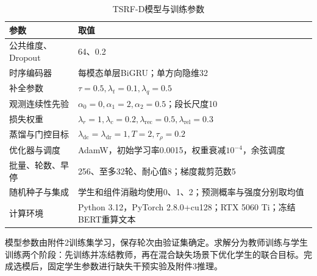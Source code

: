 \begin{table}[htbp]\centering\small
\caption{TSRF-D模型与训练参数}\label{q2:tab:params}
\begin{tabularx}{\linewidth}{p{4.4cm}Y}\toprule
参数 & 取值\\\midrule
公共维度、Dropout & 64、0.2\\
时序编码器 & 每模态单层BiGRU；单方向隐维32\\
补全参数 & $\tau=0.5,\lambda_t=0.1,\lambda_q=0.5$\\
观测连续性先验 & $\alpha_0=0,\alpha_1=2,\alpha_2=0.5$；段长尺度10\\
损失权重 & $\lambda_r=1,\lambda_c=0.2,\lambda_{\mathrm{rec}}=0.5,\lambda_{\mathrm{rel}}=0.3$\\
蒸馏与门控目标 & $\lambda_{\mathrm{dc}}=\lambda_{\mathrm{dr}}=1,T=2,\tau_{\rho}=0.2$\\
优化器与调度 & AdamW，初始学习率0.0015，权重衰减$10^{-4}$，余弦调度\\
批量、轮数、早停 & 256、至多32轮、耐心值8；梯度裁剪范数5\\
随机种子与集成 & 学生和组件消融均使用0、1、2；预测概率与强度分别取均值\\
计算环境 & Python 3.12，PyTorch 2.8.0+cu128；RTX 5060 Ti；冻结BERT重算文本\\\bottomrule
\end{tabularx}\end{table}

模型参数由附件2训练集学习，保存轮次由验证集确定。求解分为教师训练与学生训练两个阶段：先训练并冻结教师，再在混合缺失场景下优化学生的联合目标。完成选模后，固定学生参数进行缺失干预实验及附件3推理。

